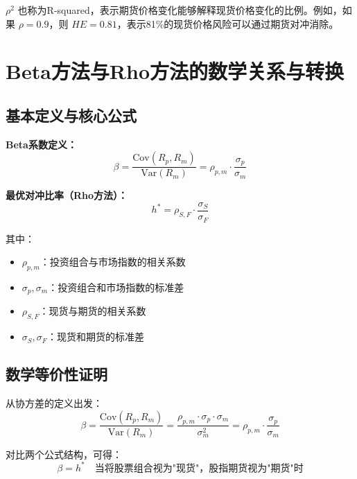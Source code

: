 $\rho^2$ 也称为R-squared，表示期货价格变化能够解释现货价格变化的比例。例如，如果 $\rho = 0.9$，则 $HE = 0.81$，表示81\%的现货价格风险可以通过期货对冲消除。





\section{Beta方法与Rho方法的数学关系与转换}

\subsection{基本定义与核心公式}

\textbf{Beta系数定义：}
\begin{equation}
\beta = \frac{\text{Cov}(R_p, R_m)}{\text{Var}(R_m)} = \rho_{p,m} \cdot \frac{\sigma_p}{\sigma_m}
\end{equation}

\textbf{最优对冲比率（Rho方法）：}
\begin{equation}
h^* = \rho_{S,F} \cdot \frac{\sigma_S}{\sigma_F}
\end{equation}

其中：
\begin{itemize}
    \item $\rho_{p,m}$：投资组合与市场指数的相关系数
    \item $\sigma_p, \sigma_m$：投资组合和市场指数的标准差
    \item $\rho_{S,F}$：现货与期货的相关系数
    \item $\sigma_S, \sigma_F$：现货和期货的标准差
\end{itemize}

\subsection{数学等价性证明}

从协方差的定义出发：
\begin{equation}
\beta = \frac{\text{Cov}(R_p, R_m)}{\text{Var}(R_m)} = \frac{\rho_{p,m} \cdot \sigma_p \cdot \sigma_m}{\sigma_m^2} = \rho_{p,m} \cdot \frac{\sigma_p}{\sigma_m}
\end{equation}

对比两个公式结构，可得：
\begin{equation}
\boxed{\beta = h^* \quad \text{当将股票组合视为"现货"，股指期货视为"期货"时}}
\end{equation}


